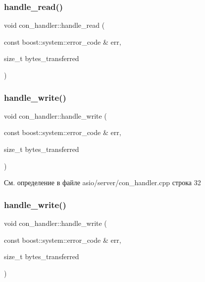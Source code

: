 \subsubsection{\texorpdfstring{handle\_read()}{handle\_read()}\hspace{0.1cm}{\footnotesize\ttfamily [2/2]}}
{\footnotesize\ttfamily void con\+\_\+handler\+::handle\+\_\+read (\begin{DoxyParamCaption}\item[{const boost\+::system\+::error\+\_\+code \&}]{err,  }\item[{size\+\_\+t}]{bytes\+\_\+transferred }\end{DoxyParamCaption})}

\mbox{\label{classcon__handler_a10169d7b3588adb849d7e7c02c46375a}} 
\subsubsection{\texorpdfstring{handle\_write()}{handle\_write()}\hspace{0.1cm}{\footnotesize\ttfamily [1/2]}}
{\footnotesize\ttfamily void con\+\_\+handler\+::handle\+\_\+write (\begin{DoxyParamCaption}\item[{const boost\+::system\+::error\+\_\+code \&}]{err,  }\item[{size\+\_\+t}]{bytes\+\_\+transferred }\end{DoxyParamCaption})}



См. определение в файле asio/server/con\+\_\+handler.\+cpp строка 32

\mbox{\label{classcon__handler_a10169d7b3588adb849d7e7c02c46375a}} 
\subsubsection{\texorpdfstring{handle\_write()}{handle\_write()}\hspace{0.1cm}{\footnotesize\ttfamily [2/2]}}
{\footnotesize\ttfamily void con\+\_\+handler\+::handle\+\_\+write (\begin{DoxyParamCaption}\item[{const boost\+::system\+::error\+\_\+code \&}]{err,  }\item[{size\+\_\+t}]{bytes\+\_\+transferred }\end{DoxyParamCaption})}


